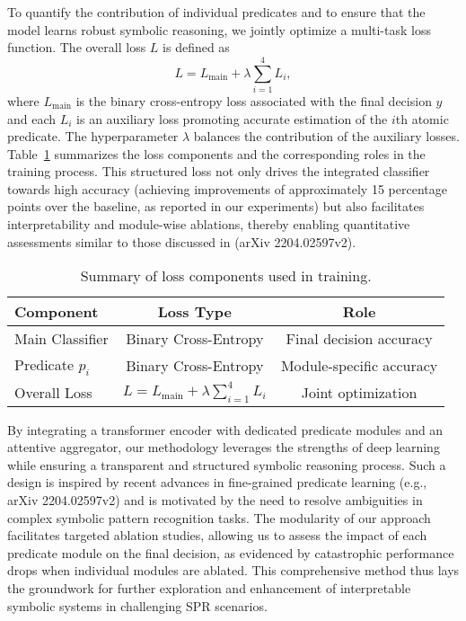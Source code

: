 \documentclass{article}
\begin{document}
To quantify the contribution of individual predicates and to ensure that the model learns robust symbolic reasoning, we jointly optimize a multi-task loss function. The overall loss \( L \) is defined as 
\[
L = L_{\text{main}} + \lambda \sum_{i=1}^{4} L_i,
\]
where \( L_{\text{main}} \) is the binary cross-entropy loss associated with the final decision \( y \) and each \( L_i \) is an auxiliary loss promoting accurate estimation of the \( i \)th atomic predicate. The hyperparameter \( \lambda \) balances the contribution of the auxiliary losses. Table~\ref{tab:loss} summarizes the loss components and the corresponding roles in the training process. This structured loss not only drives the integrated classifier towards high accuracy (achieving improvements of approximately 15 percentage points over the baseline, as reported in our experiments) but also facilitates interpretability and module-wise ablations, thereby enabling quantitative assessments similar to those discussed in (arXiv 2204.02597v2).

\begin{table}[h]
\centering
\begin{tabular}{lcc}
\hline
Component & Loss Type & Role \\\hline
Main Classifier & Binary Cross-Entropy & Final decision accuracy \\
Predicate \(p_i\) & Binary Cross-Entropy & Module-specific accuracy \\\hline
Overall Loss & \(L = L_{\text{main}} + \lambda \sum_{i=1}^{4} L_i\) & Joint optimization \\\hline
\end{tabular}
\caption{Summary of loss components used in training.}
\label{tab:loss}
\end{table}

By integrating a transformer encoder with dedicated predicate modules and an attentive aggregator, our methodology leverages the strengths of deep learning while ensuring a transparent and structured symbolic reasoning process. Such a design is inspired by recent advances in fine-grained predicate learning (e.g., arXiv 2204.02597v2) and is motivated by the need to resolve ambiguities in complex symbolic pattern recognition tasks. The modularity of our approach facilitates targeted ablation studies, allowing us to assess the impact of each predicate module on the final decision, as evidenced by catastrophic performance drops when individual modules are ablated. This comprehensive method thus lays the groundwork for further exploration and enhancement of interpretable symbolic systems in challenging SPR scenarios.
\end{document}
